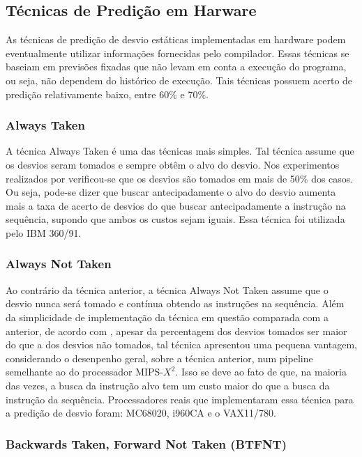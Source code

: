 \documentclass[12pt]{article}
\begin{document}
\subsection{Técnicas de Predição em Harware}

As técnicas de predição de desvio estáticas implementadas em hardware podem eventualmente utilizar informações fornecidas pelo compilador. Essas técnicas se baseiam em previsões fixadas que não levam em conta a execução do programa, ou seja, não dependem do histórico de execução. Tais técnicas possuem acerto de predição relativamente baixo, entre 60\% e 70\%.

\subsubsection{Always Taken}

A técnica Always Taken é uma das técnicas mais simples. Tal técnica assume que os desvios seram tomados e sempre obtêm o alvo do desvio. Nos experimentos realizados por \cite{smith1981study} verificou-se que os desvios são tomados em mais de 50\% dos casos. Ou seja, pode-se dizer que buscar antecipadamente o alvo do desvio aumenta mais a taxa de acerto de desvios do que buscar antecipadamente a instrução na sequência, supondo que ambos os custos sejam iguais. Essa técnica foi utilizada pelo IBM 360/91.

\subsubsection{Always Not Taken}

Ao contrário da técnica anterior, a técnica Always Not Taken assume que o desvio nunca será tomado e contínua obtendo as instruções na sequência. Além da simplicidade de implementação da técnica em questão comparada com a anterior, de acordo com \cite{mcfarling1986reducing}, apesar da percentagem dos desvios tomados ser maior do que a dos desvios não tomados, tal técnica apresentou uma pequena vantagem, considerando o desenpenho geral, sobre a técnica anterior, num pipeline semelhante ao do processador MIPS-$X^2$. Isso se deve ao fato de que, na maioria das vezes, a busca da instrução alvo tem um custo maior do que a busca da instrução da sequência. Processadores reais que implementaram essa técnica para a predição de desvio foram: MC68020, i960CA e o VAX11/780.

\subsubsection{Backwards Taken, Forward Not Taken (BTFNT)}
\end{document}
